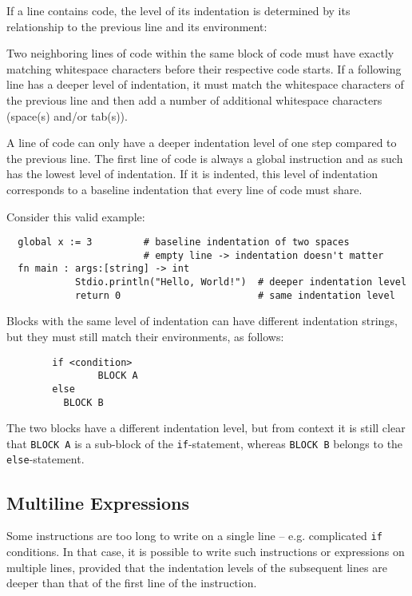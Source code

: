 \documentclass{article}
\newcommand{\code}[1]{\lstinline[columns=fixed]{#1}}
\begin{document}
		If a line contains code, the level of its indentation is determined by its relationship to the previous line and its environment:
		
		Two neighboring lines of code within the same block of code must have exactly matching whitespace characters before their respective code starts. If a following line has a deeper level of indentation, it must match the whitespace characters of the previous line and then add a number of additional whitespace characters (space(s) and/or tab(s)).
		
		A line of code can only have a deeper indentation level of one step compared to the previous line. The first line of code is always a global instruction and as such has the lowest level of indentation. If it is indented, this level of indentation corresponds to a baseline indentation that every line of code must share.
		
		Consider this valid example:
		
		\begin{lstlisting}
  global x := 3 		# baseline indentation of two spaces
						# empty line -> indentation doesn't matter
  fn main : args:[string] -> int
  			Stdio.println("Hello, World!")	# deeper indentation level
  			return 0						# same indentation level
		\end{lstlisting}
		
		Blocks with the same level of indentation can have different indentation strings, but they must still match their environments, as follows:
		
		\begin{lstlisting}
		if <condition>
				BLOCK A
		else
		  BLOCK B
		\end{lstlisting}
		
		The two blocks have a different indentation level, but from context it is still clear that \code{BLOCK A} is a sub-block of the \code{if}-statement, whereas \code{BLOCK B} belongs to the \code{else}-statement.
		
		\subsection{Multiline Expressions}
		
			Some instructions are too long to write on a single line -- e.g. complicated \code{if} conditions. In that case, it is possible to write such instructions or expressions on multiple lines, provided that the indentation levels of the subsequent lines are deeper than that of the first line of the instruction.
			
\end{document}

